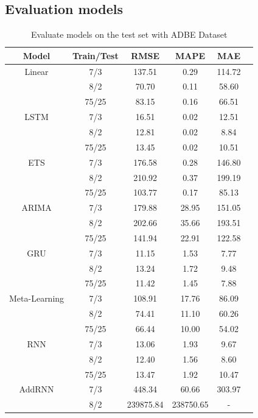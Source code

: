 \documentclass{ieeeojies}
\begin{document}
\subsection{Evaluation models}
\vspace{-20pt}
\begin{table}[H]
\centering
\begin{tabular}{cccccc}
\toprule
\textbf{Model} & \textbf{Train/Test} & \textbf{RMSE} & \textbf{MAPE} & \textbf{MAE} \\ 
\midrule
Linear & 7/3 & 137.51 & 0.29 & 114.72 \\ 
       & 8/2 & 70.70 & 0.11 & 58.60 \\ 
       & 75/25 & 83.15 & 0.16 & 66.51 \\ 
\midrule
LSTM   & 7/3 & 16.51 & 0.02 & 12.51 \\ 
       & 8/2 & 12.81 & 0.02 & 8.84 \\ 
       & 75/25 & 13.45 & 0.02 & 10.51 \\ 
\midrule
ETS    & 7/3 & 176.58 & 0.28 & 146.80 \\ 
       & 8/2 & 210.92 & 0.37 & 199.19 \\ 
       & 75/25 & 103.77 & 0.17 & 85.13 \\ 
\midrule
ARIMA  & 7/3 & 179.88 & 28.95 & 151.05 \\ 
       & 8/2 & 202.66 & 35.66 & 193.51 \\ 
       & 75/25 & 141.94 & 22.91 & 122.58 \\ 
\midrule
GRU    & 7/3 & 11.15 & 1.53 & 7.77 \\ 
       & 8/2 & 13.24 & 1.72 & 9.48 \\ 
       & 75/25 & 11.42 & 1.45 & 7.88 \\ 
\midrule
Meta-Learning & 7/3 & 108.91 & 17.76 & 86.09 \\ 
              & 8/2 & 74.41 & 11.10 & 60.26 \\ 
              & 75/25 & 66.44 & 10.00 & 54.02 \\ 
\midrule
RNN    & 7/3 & 13.06 & 1.93 & 9.67 \\ 
       & 8/2 & 12.40 & 1.56 & 8.60 \\ 
       & 75/25 & 13.47 & 1.92 & 10.47 \\ 
\midrule
AddRNN & 7/3 & 448.34 & 60.66 & 303.97 \\ 
       & 8/2 & 239875.84 & 238750.65 & - \\ 
\bottomrule
\end{tabular}
\caption{Evaluate models on the test set with ADBE Dataset}
\label{table:performance_metrics}
\end{table}
\end{document}

